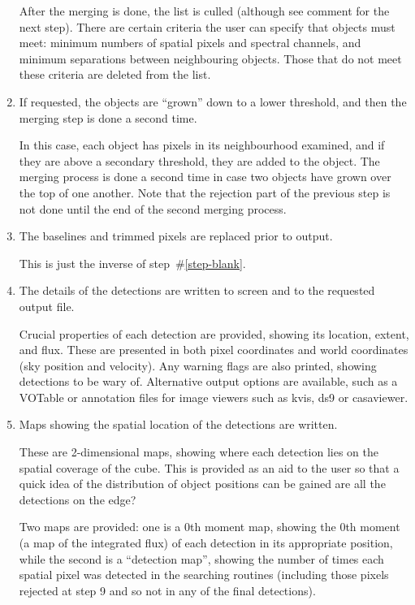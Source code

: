 \begin{enumerate}
  After the merging is done, the list is culled (although see comment
  for the next step). There are certain criteria the user can specify
  that objects must meet: minimum numbers of spatial pixels and
  spectral channels, and minimum separations between neighbouring
  objects. Those that do not meet these criteria are deleted
  from the list.

\item If requested, the objects are ``grown'' down to a lower
  threshold, and then the merging step is done a second time.

  In this case, each object has pixels in its neighbourhood examined,
  and if they are above a secondary threshold, they are added to the
  object. The merging process is done a second time in case two
  objects have grown over the top of one another. Note that the
  rejection part of the previous step is not done until the end of the
  second merging process.

\item The baselines and trimmed pixels are replaced prior to output.

  This is just the inverse of step~\#\ref{step-blank}.

\item The details of the detections are written to screen and to the
  requested output file.

  Crucial properties of each detection are provided, showing its
  location, extent, and flux. These are presented in both pixel
  coordinates and world coordinates (\eg sky position and
  velocity). Any warning flags are also printed, showing detections to
  be wary of. Alternative output options are available, such as a
  VOTable or annotation files for image viewers such as kvis, ds9 or
  casaviewer. 

\item Maps showing the spatial location of the detections are written.

  These are 2-dimensional maps, showing where each detection lies on
  the spatial coverage of the cube. This is provided as an aid to the
  user so that a quick idea of the distribution of object positions
  can be gained \eg are all the detections on the edge?

  Two maps are provided: one is a 0th moment map, showing the 0th
  moment (\ie a map of the integrated flux) of each detection in its
  appropriate position, while the second is a ``detection map'',
  showing the number of times each spatial pixel was detected in the
  searching routines (including those pixels rejected at step 9 and so
  not in any of the final detections).


\end{enumerate}
